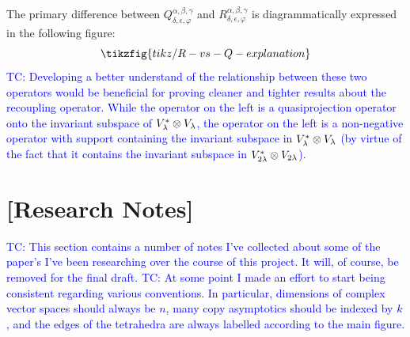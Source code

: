 \documentclass[notitlepage, 10pt]{article}
\begin{document}
The primary difference between $Q^{\alpha,\beta,\gamma}_{\delta,\epsilon,\varphi}$ and $R^{\alpha,\beta,\gamma}_{\delta,\epsilon,\varphi}$ is diagrammatically expressed in the following figure:
\begin{equation*}
    \tikzfig{tikz/R-vs-Q-explanation}
\end{equation*}
\textcolor{blue}{TC: Developing a better understand of the relationship between these two operators would be beneficial for proving cleaner and tighter results about the recoupling operator. While the operator on the left is a quasiprojection operator onto the invariant subspace of $V_{\lambda}^{*} \otimes V_{\lambda}$, the operator on the left is a non-negative operator with support containing the invariant subspace in $V_{\lambda}^{*} \otimes V_{\lambda}$ (by virtue of the fact that it contains the invariant subspace in $V_{2\lambda}^{*} \otimes V_{2\lambda}$). }





\clearpage
\section{[Research Notes]}

\textcolor{blue}{TC: This section contains a number of notes I've collected about some of the paper's I've been researching over the course of this project. It will, of course, be removed for the final draft.}
\textcolor{blue}{TC: At some point I made an effort to start being consistent regarding various conventions. In particular, dimensions of complex vector spaces should always be $n$, many copy asymptotics should be indexed by $k$, and the edges of the tetrahedra are always labelled according to the main figure.}
\end{document}
